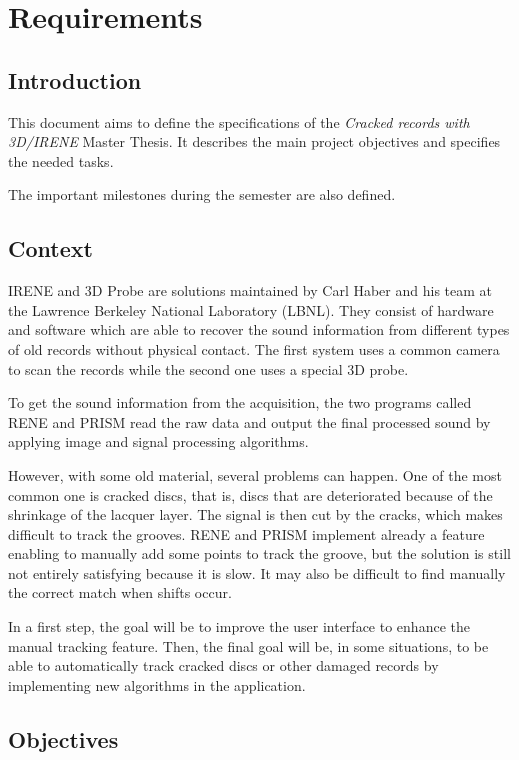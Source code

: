 \chapter{Requirements}
\label{chap:requirements}

\section{Introduction}

This document aims to define the specifications of the \emph{Cracked records with 3D/IRENE} Master Thesis. It describes the main project objectives and specifies the needed tasks.

The important milestones during the semester are also defined.

\section{Context}

IRENE and 3D Probe are solutions maintained by Carl Haber and his team at the Lawrence Berkeley National Laboratory (LBNL). They consist of hardware and software which are able to recover the sound information from different types of old records without physical contact. The first system uses a common camera to scan the records while the second one uses a special 3D probe.

To get the sound information from the acquisition, the two programs called RENE and PRISM read the raw data and output the final processed sound by applying image and signal processing algorithms.

However, with some old material, several problems can happen. One of the most common one is cracked discs, that is, discs that are deteriorated because of the shrinkage of the lacquer layer. The signal is then cut by the cracks, which makes difficult to track the grooves. RENE and PRISM implement already a feature enabling to manually add some points to track the groove, but the solution is still not entirely satisfying because it is slow. It may also be difficult to find manually the correct match when shifts occur.

In a first step, the goal will be to improve the user interface to enhance the manual tracking feature. Then, the final goal will be, in some situations, to be able to automatically track cracked discs or other damaged records by implementing new algorithms in the application.

\section{Objectives}

